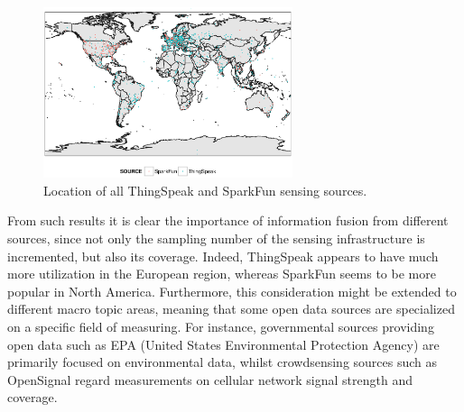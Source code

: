 \documentclass[conference]{IEEEtran}
\begin{document}
\begin{figure}[!t]
\centering
\includegraphics[width=0.65\textwidth]{img/map.eps} 
\caption{Location of all ThingSpeak and SparkFun sensing sources.}
\label{geo}
\end{figure}

From such results it is clear the importance of information fusion from different sources, since not only the sampling number of the sensing infrastructure is incremented, but also its coverage.
Indeed, ThingSpeak appears to have much more utilization in the European region, whereas SparkFun seems to be more popular in North America.
Furthermore, this consideration might be extended to different macro topic areas, meaning that some open data sources are specialized on a specific field of measuring.
For instance, governmental sources providing open data such as EPA (United States Environmental Protection Agency) \cite{epa} are primarily focused on environmental data, whilst crowdsensing sources such as OpenSignal \cite{opensignal} regard measurements on cellular network signal strength and coverage.
\\
\end{document}
